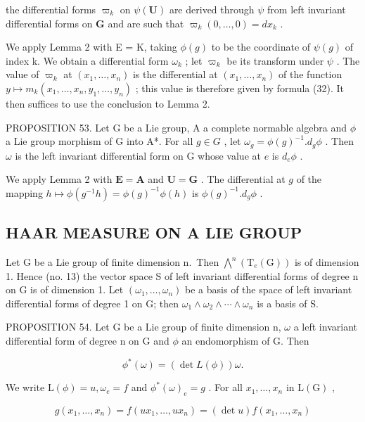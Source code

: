 the differential forms \(\varpi_k\) on \(\psi(\mathbf{U})\) are derived through \(\psi\) from left invariant differential forms on \(\mathbf{G}\) and are such that \(\varpi_k(0,\ldots,0) = dx_k\) .

We apply Lemma 2 with E = K, taking \(\phi(g)\) to be the coordinate of \(\psi(g)\) of index k. We obtain a differential form \(\omega_{k}\) ; let \(\varpi_{k}\) be its transform under \(\psi\) . The value of \(\varpi_{k}\) at \((x_{1},\ldots,x_{n})\) is the differential at \((x_{1},\ldots,x_{n})\) of the function \(y\mapsto m_{k}(x_{1},\ldots,x_{n},y_{1},\ldots,y_{n})\) ; this value is therefore given by formula (32). It then suffices to use the conclusion to Lemma 2.

PROPOSITION 53. Let G be a Lie group, A a complete normable algebra and \(\phi\) a Lie group morphism of G into A*. For all \(g \in G\) , let \(\omega_g = \phi(g)^{-1}.d_g\phi\) . Then \(\omega\) is the left invariant differential form on G whose value at \(e\) is \(d_e\phi\) .

We apply Lemma 2 with \(\mathbf{E} = \mathbf{A}\) and \(\mathbf{U} = \mathbf{G}\) . The differential at \(g\) of the mapping \(h \mapsto \phi(g^{-1}h) = \phi(g)^{-1}\phi(h)\) is \(\phi(g)^{-1}.d_g\phi\) .

\subsection{HAAR MEASURE ON A LIE GROUP}

Let G be a Lie group of finite dimension n.~Then \(\bigwedge^{n}(\mathrm{T}_{e}(\mathrm{G}))\) is of dimension 1. Hence (no. 13) the vector space S of left invariant differential forms of degree n on G is of dimension 1. Let \((\omega_{1},\ldots,\omega_{n})\) be a basis of the space of left invariant differential forms of degree 1 on G; then \(\omega_{1}\wedge\omega_{2}\wedge\cdots\wedge\omega_{n}\) is a basis of S.

PROPOSITION 54. Let G be a Lie group of finite dimension n, \(\omega\) a left invariant differential form of degree n on G and \(\phi\) an endomorphism of G. Then

\[
\phi^ {*} (\omega) = (\det L (\phi)) \omega .
\]

We write \(\mathrm{L}(\phi) = u, \omega_e = f\) and \(\phi^*(\omega)_e = g\) . For all \(x_1, \ldots, x_n\) in \(\mathrm{L}(\mathrm{G})\) ,

\[
g (x _ {1}, \dots , x _ {n}) = f (u x _ {1}, \dots , u x _ {n}) = (\det u) f (x _ {1}, \dots , x _ {n})
\]

